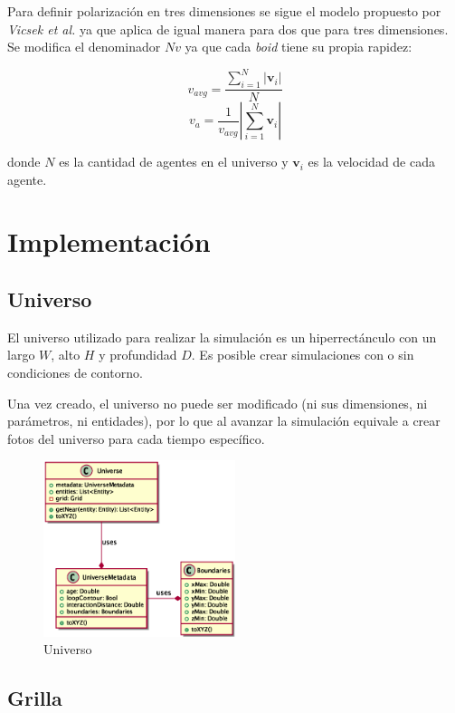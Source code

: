 \documentclass[a4paper]{article}
\begin{document}
            Para definir polarización en tres dimensiones se sigue el modelo propuesto por \textit{Vicsek et al.}\cite{PhysRevLett.75.1226} ya que aplica de igual manera para dos que para tres dimensiones. Se modifica el denominador $Nv$ ya que cada \textit{boid} tiene su propia rapidez:

            $$v_{avg} = \frac{\sum_{i=1}^{N}\left|\mathbf{v}_i\right|}{N}$$
            $$v_a = \frac{1}{v_{avg}}\left|\sum_{i=1}^{N}\mathbf{v}_i\right|$$

            donde $N$ es la cantidad de agentes en el universo y $\mathbf{v}_i$ es la velocidad de cada agente.

    \section{Implementación}

        \subsection{Universo}

            El universo utilizado para realizar la simulación es un hiperrectánculo con un largo $W$, alto $H$ y profundidad $D$. Es posible crear simulaciones con o sin condiciones de contorno.

            Una vez creado, el universo no puede ser modificado (ni sus dimensiones, ni parámetros, ni entidades), por lo que al avanzar la simulación equivale a crear fotos del universo para cada tiempo específico.


            \begin{figure}[H]
                \centering
                \includegraphics[width=0.5\textwidth]{../imgs/universe}
                \caption{Universo}
                \label{fig:universe_implementation}
            \end{figure}

        \subsection{Grilla}
\end{document}
